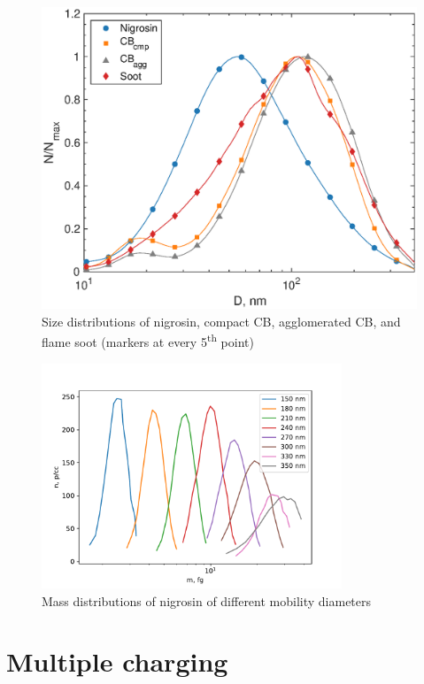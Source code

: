 \documentclass[12pt]{article}
\begin{document}
\begin{figure}[htp]
\centering
\includegraphics[scale=0.7]{images/fig_supp_smps.eps}
\caption{Size distributions of nigrosin, compact CB, agglomerated CB, and flame soot (markers at every 5\textsuperscript{th} point)}
\label{s:fig:smps}
\end{figure}

\begin{figure}[htp]
    \centering
    \includegraphics[width=0.8\textwidth]{images/apm-bare-nigrosin.pdf}
    \caption{Mass distributions of nigrosin of different mobility diameters}
    \label{s:fig:apm-bare-nigrosin}
\end{figure}

\section{Multiple charging}
\end{document}

